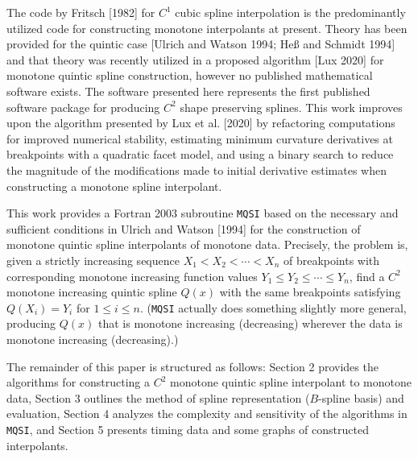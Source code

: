 The code by Fritsch [1982] for $C^1$ cubic spline interpolation is the
predominantly utilized code for constructing monotone interpolants at
present. Theory has been provided for the quintic case [Ulrich and
Watson 1994; He{\ss} and Schmidt 1994] and that theory was recently
utilized in a proposed algorithm [Lux 2020] for monotone quintic
spline construction, however no published mathematical software
exists. The software presented here represents the first published
software package for producing $C^2$ shape preserving splines. This
work improves upon the algorithm presented by Lux et al. [2020] by
refactoring computations for improved numerical stability, estimating
minimum curvature derivatives at breakpoints with a quadratic facet
model, and using a binary search to reduce the magnitude of the
modifications made to initial derivative estimates when constructing a
monotone spline interpolant.


This work provides a Fortran 2003 subroutine {\tt MQSI} based on the
necessary and sufficient conditions in Ulrich and Watson [1994] for the
construction of monotone quintic spline interpolants of monotone data.
Precisely, the problem is, given a strictly increasing sequence $X_1<X_2<
\cdots <X_n$ of breakpoints with corresponding monotone increasing
function values $Y_1\le Y_2\le \cdots \le Y_n$, find a $C^2$ monotone
increasing quintic spline $Q(x)$ with the same breakpoints satisfying
$Q(X_i)=Y_i$ for $1\le i\le n$. ({\tt MQSI} actually does something slightly
more general, producing $Q(x)$ that is monotone increasing (decreasing)
wherever the data is monotone increasing (decreasing).)

The remainder of this paper is structured as follows: Section 2 provides
the algorithms for constructing a $C^2$ monotone quintic spline interpolant
to monotone data, Section 3 outlines the method of spline representation
($B$-spline basis) and evaluation, Section 4 analyzes the complexity and
sensitivity of the algorithms in {\tt MQSI}, and Section 5 presents 
timing data and some graphs of constructed interpolants.

